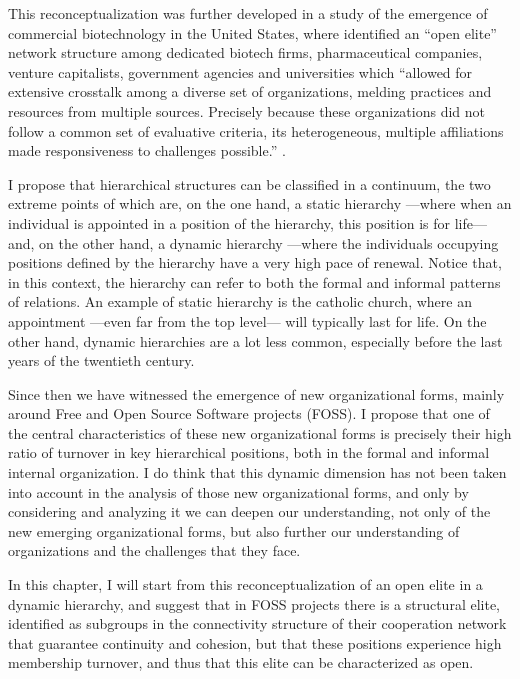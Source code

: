 This reconceptualization was further developed in a study of the emergence of commercial biotechnology in the United States, where \citet{powell:2005} identified an ``open elite'' network structure among dedicated biotech firms, pharmaceutical companies, venture capitalists, government agencies and universities which ``allowed for extensive crosstalk among a diverse set of organizations, melding practices and resources from multiple sources. Precisely because these organizations did not follow a common set of evaluative criteria, its heterogeneous, multiple affiliations made responsiveness to challenges possible.'' \citet[467]{powell:2005}.

I propose that hierarchical structures can be classified in a continuum, the two extreme points of which are, on the one hand, a static hierarchy ---where when an individual is appointed in a position of the hierarchy, this position is for life--- and, on the other hand, a dynamic hierarchy ---where the individuals occupying positions defined by the hierarchy have a very high pace of renewal. Notice that, in this context, the hierarchy can refer to both the formal and informal patterns of relations. An example of static hierarchy is the catholic church, where an appointment ---even far from the top level--- will typically last for life. On the other hand, dynamic hierarchies are a lot less common, especially before the last years of the twentieth century.

Since then we have witnessed the emergence of new organizational forms, mainly around Free and Open Source Software projects (FOSS). I propose that one of the central characteristics of these new organizational forms is precisely their high ratio of turnover in key hierarchical positions, both in the formal and informal internal organization. I do think that this dynamic dimension has not been taken into account in the analysis of those new organizational forms, and only by considering and analyzing it we can deepen our understanding, not only of the new emerging organizational forms, but also further our understanding of organizations and the challenges that they face.

In this chapter, I will start from this reconceptualization of an open elite in a dynamic hierarchy, and suggest that in FOSS projects there is a structural elite, identified as subgroups in the connectivity structure of their cooperation network that guarantee continuity and cohesion, but that these positions experience high membership turnover, and thus that this elite can be characterized as open.

